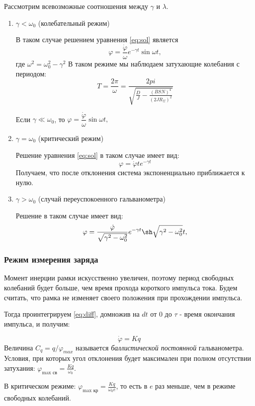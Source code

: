 \documentclass[a4paper, 12pt]{article}
\begin{document}
Рассмотрим всевозможные соотношения между $\gamma$ и $\lambda$.

\begin{enumerate}

\item $\gamma < \omega_0$ (колебательный режим)

В таком случае решением уравнения \ref{eq:sol} является 
$$ \varphi = \dfrac{\dot{\varphi}}{\omega}e^{-\gamma t} \sin \omega t,$$
где $\omega^2 = \omega^2_0 - \gamma^2$
В таком режиме мы наблюдаем затухающие колебания с периодом:
$$T = \dfrac{2\pi}{\omega} = \dfrac{2pi}{\sqrt{\frac{D}{J} - \frac{(BSN)^4}{(2JR_\Sigma)^2}}}$$

Если $\gamma \ll \omega_0$, то $ \varphi = \dfrac{\dot{\varphi}}{\omega} \sin \omega t,$

\item $\gamma = \omega_0$ (критический режим)

Решение уравнения \ref{eq:sol} в таком случае имеет вид:
$$\varphi = \dot{\varphi	}te^{-\gamma   t}$$
Получаем, что после отклонения система экспоненциально приближается к нулю.

\item $\gamma > \omega_0$ (случай переуспокоенного гальванометра)

Решение в таком случае имеет вид:
$$ \varphi = \dfrac{\dot{\varphi}}{\sqrt{\gamma^2 - \omega_0^2}}e^{-\gamma t} \sh\sqrt{\gamma^2 - \omega_0^2}  t,$$
\end{enumerate}

\subsubsection*{Режим измерения заряда}

Момент инерции рамки искусственно увеличен, поэтому период свободных колебаний будет больше, чем время прохода короткого импульса тока. Будем считать, что рамка не изменяет своего положения при прохождении импульса.

Тогда проинтегрируем \ref{eq:diff}, домножив на $dt$ от $0$ до $\tau$ - время окончания импульса,  и получим:

$$\dot{\varphi} = K q$$
Величина $C_q = q/\varphi_{max}$ называется \textit{баллистической постоянной} гальванометра. Условия, при которых угол отклонения будет максимален при полном отсутствии затухания: $\varphi_\text{max св} = \frac{Kq}{\omega_0}$. 

В критическом режиме: 
$\varphi_\text{max кр} = \frac{Kq}{\omega_0e}$, то есть в $e$ раз меньше, чем в режиме свободных колебаний.
\end{document}
